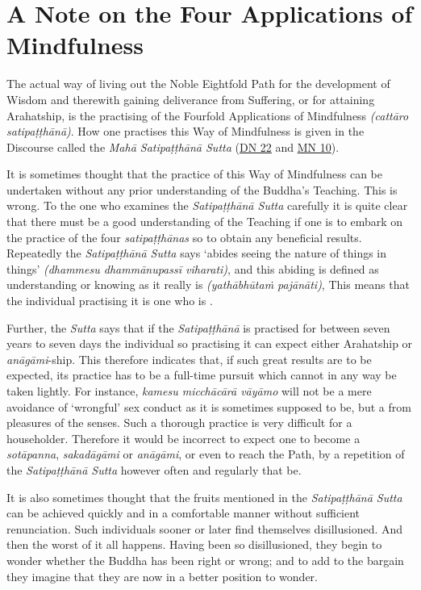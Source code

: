 \chapter{A Note on the Four Applications of Mindfulness}

\protect\hypertarget{start}{}{}The actual way of living out the Noble Eightfold Path for the development of Wisdom and therewith gaining deliverance from Suffering, or for attaining Arahatship, is the practising of the Fourfold Applications of Mindfulness \emph{(cattāro satipaṭṭhānā)}. How one practises this Way of Mindfulness is given in the Discourse called the \emph{Mahā Satipaṭṭhānā Sutta} (\href{https://suttacentral.net/dn22/en/sujato}{DN 22} and \href{https://suttacentral.net/mn10/en/sujato}{MN 10}).

It is sometimes thought that the practice of this Way of Mindfulness can be undertaken without any prior understanding of the Buddha's Teaching. This is wrong. To the one who examines the \emph{Satipaṭṭhānā Sutta} carefully it is quite clear that there must be a good understanding of the Teaching if one is to embark on the practice of the four \emph{satipaṭṭhānas} so to obtain any beneficial results. Repeatedly the \emph{Satipaṭṭhānā Sutta} says `abides seeing the nature of things in things' \emph{(dhammesu dhammānupassī viharati)}, and this abiding is defined as understanding or knowing as it really is \emph{(yathābhūtaṁ pajānāti)}, This means that the individual practising it is one who is .

Further, the \emph{Sutta} says that if the \emph{Satipaṭṭhānā} is practised for between seven years to seven days the individual so practising it can expect either Arahatship or \emph{anāgāmi}-ship. This therefore indicates that, if such great results are to be expected, its practice has to be a full-time pursuit which cannot in any way be taken lightly. For instance, \emph{kamesu micchācārā vāyāmo} will not be a mere avoidance of `wrongful' sex conduct as it is sometimes supposed to be, but a  from  pleasures of the senses. Such a thorough practice is very difficult for a householder. Therefore it would be incorrect to expect one to become a \emph{sotāpanna}, \emph{sakadāgāmi} or \emph{anāgāmi}, or even to reach the Path, by a repetition of the \emph{Satipaṭṭhānā Sutta} however often and regularly that be.

It is also sometimes thought that the fruits mentioned in the \emph{Satipaṭṭhānā Sutta} can be achieved quickly and in a comfortable manner without sufficient renunciation. Such individuals sooner or later find themselves disillusioned. And then the worst of it all happens. Having been so disillusioned, they begin to wonder whether the Buddha has been right or wrong; and to add to the bargain they imagine that they are now in a better position to wonder.

